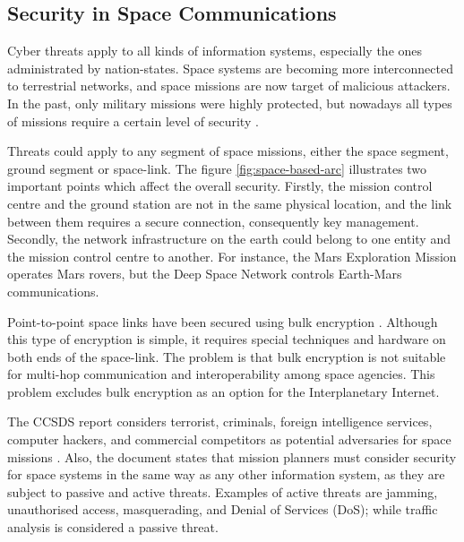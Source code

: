 \subsection{Security in Space Communications}


Cyber threats apply to all kinds of information systems, especially the ones administrated by nation-states. Space systems are becoming more interconnected to terrestrial networks, and space missions are now target of malicious attackers.  In the past, only military missions were highly protected, but nowadays all types of missions require a certain level of security \cite{book2006security}.

Threats could apply to any segment of space missions, either the space segment, ground segment or space-link. The figure \ref{fig:space-based-arc} illustrates two important points which affect the overall security.  Firstly, the mission control centre and the ground station are not in the same physical location, and the link between them requires a secure connection, consequently key management. Secondly, the network infrastructure on the earth could belong to one entity and the mission control centre to another.  For instance, the  Mars Exploration Mission operates Mars rovers, but the Deep Space Network controls Earth-Mars communications.

Point-to-point space links have been secured using bulk encryption \cite{book2011space}. Although this type of encryption is simple, it requires special techniques and hardware on both ends of the space-link. The problem is that bulk encryption is not suitable for multi-hop communication and interoperability among space agencies. This problem excludes bulk encryption as an option for the Interplanetary Internet. %

The CCSDS report considers terrorist, criminals, foreign intelligence services, computer hackers, and commercial competitors as potential adversaries for space missions \cite{book2006security}.  Also, the document states that mission planners must consider security for space systems in the same way as any other information system, as they are subject to passive and active threats. Examples of active threats are jamming, unauthorised access, masquerading, and Denial of Services (DoS); while traffic analysis is considered a passive threat. 

